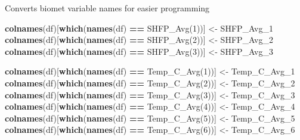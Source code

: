 \documentclass[
]{article}
\newenvironment{Shaded}{\begin{snugshade}}{\end{snugshade}}
\newcommand{\FunctionTok}[1]{\textcolor[rgb]{0.13,0.29,0.53}{\textbf{#1}}}
\newcommand{\NormalTok}[1]{#1}
\newcommand{\OtherTok}[1]{\textcolor[rgb]{0.56,0.35,0.01}{#1}}
\newcommand{\SpecialCharTok}[1]{\textcolor[rgb]{0.81,0.36,0.00}{\textbf{#1}}}
\newcommand{\StringTok}[1]{\textcolor[rgb]{0.31,0.60,0.02}{#1}}
\begin{document}
Converts biomet variable names for easier programming

\begin{Shaded}
\begin{Highlighting}[]
\FunctionTok{colnames}\NormalTok{(df)[}\FunctionTok{which}\NormalTok{(}\FunctionTok{names}\NormalTok{(df) }\SpecialCharTok{==} \StringTok{\textquotesingle{}SHFP\_Avg(1)\textquotesingle{}}\NormalTok{)] }\OtherTok{\textless{}{-}} \StringTok{\textquotesingle{}SHFP\_Avg\_1\textquotesingle{}}
\FunctionTok{colnames}\NormalTok{(df)[}\FunctionTok{which}\NormalTok{(}\FunctionTok{names}\NormalTok{(df) }\SpecialCharTok{==} \StringTok{\textquotesingle{}SHFP\_Avg(2)\textquotesingle{}}\NormalTok{)] }\OtherTok{\textless{}{-}} \StringTok{\textquotesingle{}SHFP\_Avg\_2\textquotesingle{}}
\FunctionTok{colnames}\NormalTok{(df)[}\FunctionTok{which}\NormalTok{(}\FunctionTok{names}\NormalTok{(df) }\SpecialCharTok{==} \StringTok{\textquotesingle{}SHFP\_Avg(3)\textquotesingle{}}\NormalTok{)] }\OtherTok{\textless{}{-}} \StringTok{\textquotesingle{}SHFP\_Avg\_3\textquotesingle{}}


\FunctionTok{colnames}\NormalTok{(df)[}\FunctionTok{which}\NormalTok{(}\FunctionTok{names}\NormalTok{(df) }\SpecialCharTok{==} \StringTok{\textquotesingle{}Temp\_C\_Avg(1)\textquotesingle{}}\NormalTok{)] }\OtherTok{\textless{}{-}} \StringTok{\textquotesingle{}Temp\_C\_Avg\_1\textquotesingle{}}
\FunctionTok{colnames}\NormalTok{(df)[}\FunctionTok{which}\NormalTok{(}\FunctionTok{names}\NormalTok{(df) }\SpecialCharTok{==} \StringTok{\textquotesingle{}Temp\_C\_Avg(2)\textquotesingle{}}\NormalTok{)] }\OtherTok{\textless{}{-}} \StringTok{\textquotesingle{}Temp\_C\_Avg\_2\textquotesingle{}}
\FunctionTok{colnames}\NormalTok{(df)[}\FunctionTok{which}\NormalTok{(}\FunctionTok{names}\NormalTok{(df) }\SpecialCharTok{==} \StringTok{\textquotesingle{}Temp\_C\_Avg(3)\textquotesingle{}}\NormalTok{)] }\OtherTok{\textless{}{-}} \StringTok{\textquotesingle{}Temp\_C\_Avg\_3\textquotesingle{}}
\FunctionTok{colnames}\NormalTok{(df)[}\FunctionTok{which}\NormalTok{(}\FunctionTok{names}\NormalTok{(df) }\SpecialCharTok{==} \StringTok{\textquotesingle{}Temp\_C\_Avg(4)\textquotesingle{}}\NormalTok{)] }\OtherTok{\textless{}{-}} \StringTok{\textquotesingle{}Temp\_C\_Avg\_4\textquotesingle{}}
\FunctionTok{colnames}\NormalTok{(df)[}\FunctionTok{which}\NormalTok{(}\FunctionTok{names}\NormalTok{(df) }\SpecialCharTok{==} \StringTok{\textquotesingle{}Temp\_C\_Avg(5)\textquotesingle{}}\NormalTok{)] }\OtherTok{\textless{}{-}} \StringTok{\textquotesingle{}Temp\_C\_Avg\_5\textquotesingle{}}
\FunctionTok{colnames}\NormalTok{(df)[}\FunctionTok{which}\NormalTok{(}\FunctionTok{names}\NormalTok{(df) }\SpecialCharTok{==} \StringTok{\textquotesingle{}Temp\_C\_Avg(6)\textquotesingle{}}\NormalTok{)] }\OtherTok{\textless{}{-}} \StringTok{\textquotesingle{}Temp\_C\_Avg\_6\textquotesingle{}}
\end{Highlighting}
\end{Shaded}
\end{document}
